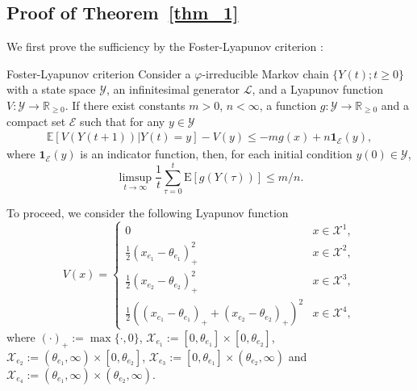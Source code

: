 \subsection{Proof of Theorem~\ref{thm_1}}
We first prove the sufficiency by the Foster-Lyapunov criterion \cite{meyn2012markov}:
\begin{namedthm*}{Foster-Lyapunov criterion}
Consider a $\varphi$-irreducible Markov chain $\{Y(t); t\ge0\}$ with a state space $\mathcal Y$, an infinitesimal generator $\mathscr L$, and a Lyapunov function $V:\mathcal Y\to\mathbb R_{\ge0}$. If there exist constants $m>0$, $n<\infty$, a function $g:\mathcal Y\to\mathbb R_{\ge0}$ and a compact set $\mathcal{E}$ such that for any $y\in\mathcal{Y}$
\begin{align*}
    \mathbb{E}[V(Y(t+1))|Y(t)=y] - V(y) \leq -mg(x) + n\mathbf{1}_{\mathcal{E}}(y),
\end{align*}
where $\mathbf{1}_{\mathcal{E}}(y)$ is an indicator function, then, for each initial condition $y(0)\in\mathcal Y$,
$$
\limsup_{t\to\infty}\frac1t\sum_{\tau=0}^t\mathrm E[g(Y(\tau))] \le m/n.
$$
\end{namedthm*}

To proceed, we consider the following Lyapunov function
\begin{equation}
    V(x) = \begin{cases}
    0 & x\in\mathcal{X}^1, \\
    \frac{1}{2}(x_{e_1}-\theta_{e_1})_+^2 & x\in\mathcal{X}^2, \\
    \frac{1}{2}(x_{e_2}-\theta_{e_2})_+^2 & x\in\mathcal{X}^3, \\
    \frac{1}{2}((x_{e_1}-\theta_{e_1})_+ + (x_{e_2}-\theta_{e_2})_+)^2 & x\in\mathcal{X}^4,
    \end{cases}
\end{equation}
where $(\cdot)_+:=\max\{\cdot, 0\}$, $\mathcal{X}_{e_1}:=[0,\theta_{e_1}]\times[0,\theta_{e_2}]$, $\mathcal{X}_{e_2}:=(\theta_{e_1}, \infty)\times[0,\theta_{e_2}]$, $\mathcal{X}_{e_3}:=[0,\theta_{e_1}]\times(\theta_{e_2}, \infty)$ and $\mathcal{X}_{e_4}:=(\theta_{e_1}, \infty)\times(\theta_{e_2}, \infty)$.

